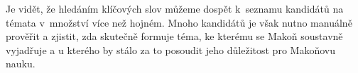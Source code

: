 Je vidět, že hledáním klíčových slov můžeme dospět k~seznamu kandidátů na témata
v~množství více než hojném. Mnoho kandidátů je však nutno
manuálně prověřit a zjistit, zda skutečně formuje téma, ke kterému se Makoň
soustavně vyjadřuje a u kterého by stálo za to posoudit jeho důležitost pro
Makoňovu nauku.




